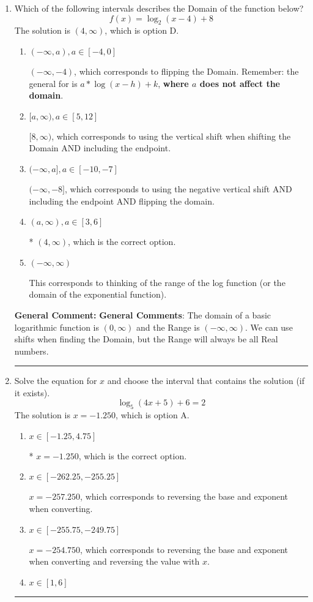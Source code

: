 \documentclass{extbook}[14pt]
\newcommand{\litem}[1]{\item #1

\rule{\textwidth}{0.4pt}}
\begin{document}
\begin{enumerate}\litem{
Which of the following intervals describes the Domain of the function below?
\[ f(x) = \log_2{(x-4)}+8 \]The solution is \( (4, \infty) \), which is option D.\begin{enumerate}[label=\Alph*.]
\item \( (-\infty, a), a \in [-4, 0] \)

$(-\infty, -4)$, which corresponds to flipping the Domain. Remember: the general for is $a*\log(x-h)+k$, \textbf{where $a$ does not affect the domain}.
\item \( [a, \infty), a \in [5, 12] \)

$[8, \infty)$, which corresponds to using the vertical shift when shifting the Domain AND including the endpoint.
\item \( (-\infty, a], a \in [-10, -7] \)

$(-\infty, -8]$, which corresponds to using the negative vertical shift AND including the endpoint AND flipping the domain.
\item \( (a, \infty), a \in [3, 6] \)

* $(4, \infty)$, which is the correct option.
\item \( (-\infty, \infty) \)

This corresponds to thinking of the range of the log function (or the domain of the exponential function).
\end{enumerate}

\textbf{General Comment:} \textbf{General Comments}: The domain of a basic logarithmic function is $(0, \infty)$ and the Range is $(-\infty, \infty)$. We can use shifts when finding the Domain, but the Range will always be all Real numbers.
}
\litem{
Solve the equation for $x$ and choose the interval that contains the solution (if it exists).
\[ \log_{5}{(4x+5)}+6 = 2 \]The solution is \( x = -1.250 \), which is option A.\begin{enumerate}[label=\Alph*.]
\item \( x \in [-1.25, 4.75] \)

* $x = -1.250$, which is the correct option.
\item \( x \in [-262.25, -255.25] \)

$x = -257.250$, which corresponds to reversing the base and exponent when converting.
\item \( x \in [-255.75, -249.75] \)

$x = -254.750$, which corresponds to reversing the base and exponent when converting and reversing the value with $x$.
\item \( x \in [1, 6] \)


\end{enumerate}}
\end{enumerate}
\end{document}
